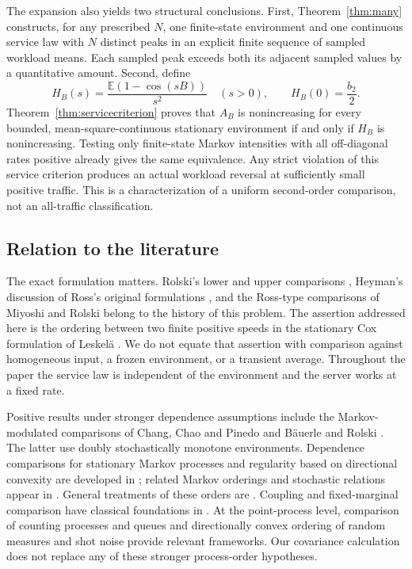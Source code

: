 \documentclass[aap,preprint]{imsart}
\numberwithin{equation}{section}
\theoremstyle{plain}
\theoremstyle{definition}
\newcommand{\E}{\mathbb E}
\newcommand{\1}{\mathbf 1}
\begin{document}
The expansion also yields two structural conclusions. First, Theorem~\ref{thm:many} constructs, for any prescribed $N$, one finite-state environment and one continuous service law with $N$ distinct peaks in an explicit finite sequence of sampled workload means. Each sampled peak exceeds both its adjacent sampled values by a quantitative amount. Second, define
\begin{equation}\label{eq:Hintro}
 H_B(s)=\frac{\E(1-\cos(sB))}{s^2}\quad(s>0),
 \qquad H_B(0)=\frac{b_2}{2}.
\end{equation}
Theorem~\ref{thm:servicecriterion} proves that $A_B$ is nonincreasing for every bounded, mean-square-continuous stationary environment if and only if $H_B$ is nonincreasing. Testing only finite-state Markov intensities with all off-diagonal rates positive already gives the same equivalence. Any strict violation of this service criterion produces an actual workload reversal at sufficiently small positive traffic. This is a characterization of a uniform second-order comparison, not an all-traffic classification.

\subsection{Relation to the literature}
The exact formulation matters. Rolski's lower and upper comparisons \cite{Rolski81,Rolski86}, Heyman's discussion of Ross's original formulations \cite{Heyman82}, and the Ross-type comparisons of Miyoshi and Rolski \cite{MR04} belong to the history of this problem. The assertion addressed here is the ordering between two finite positive speeds in the stationary Cox formulation of Leskel\"a \cite{Leskela22}. We do not equate that assertion with comparison against homogeneous input, a frozen environment, or a transient average. Throughout the paper the service law is independent of the environment and the server works at a fixed rate.

Positive results under stronger dependence assumptions include the Markov-modulated comparisons of Chang, Chao and Pinedo \cite{CCP91} and B\"auerle and Rolski \cite{BR98}. The latter use doubly stochastically monotone environments. Dependence comparisons for stationary Markov processes and regularity based on directional convexity are developed in \cite{HuPan00,MS93}; related Markov orderings and stochastic relations appear in \cite{Massey87,Leskela10}. General treatments of these orders are \cite{MullerStoyan02,ShakedShanthikumar07}. Coupling and fixed-marginal comparison have classical foundations in \cite{Strassen65,Tchen80}. At the point-process level, comparison of counting processes and queues \cite{Whitt81} and directionally convex ordering of random measures and shot noise \cite{BY09} provide relevant frameworks. Our covariance calculation does not replace any of these stronger process-order hypotheses.
\end{document}
